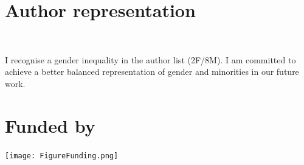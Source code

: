 \documentclass[a0,portrait]{a0poster}
\begin{document}
\begin{multicols}{3}



\section*{Author representation}
\begin{minipage}{0.1\linewidth}%
\
\end{minipage}
\begin{minipage}{0.9\linewidth}%
    I recognise a gender inequality in the author list (2F/8M). I am committed to achieve a better balanced representation of gender and minorities in our future work.  
\end{minipage}



\small
\nocite{*} %


\section*{Funded by}
\begin{center}\vspace{0cm}
\texttt{[image: FigureFunding.png]}
\end{center}%


\end{multicols}
\end{document}
